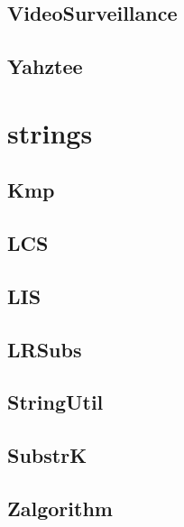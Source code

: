 \subsection{ VideoSurveillance}
\raggedbottom
\hrulefill
\subsection{ Yahztee}
\raggedbottom
\hrulefill

\section{strings}
\subsection{ Kmp}
\raggedbottom
\hrulefill
\subsection{ LCS}
\raggedbottom
\hrulefill
\subsection{ LIS}
\raggedbottom
\hrulefill
\subsection{ LRSubs}
\raggedbottom
\hrulefill
\subsection{ StringUtil}
\raggedbottom
\hrulefill
\subsection{ SubstrK}
\raggedbottom
\hrulefill
\subsection{ Zalgorithm}
\raggedbottom
\hrulefill

